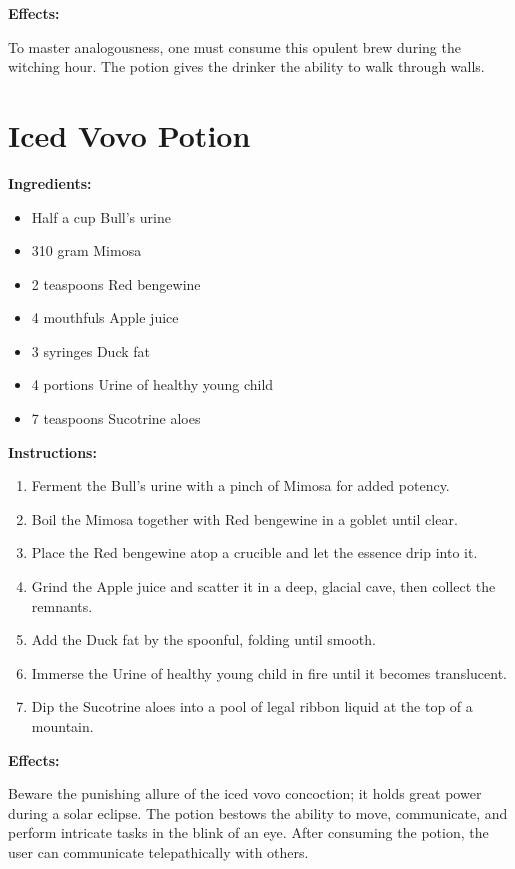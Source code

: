 \documentclass{article}
\begin{document}
\textbf{Effects:}

To master analogousness, one must consume this opulent brew during the witching hour. The potion gives the drinker the ability to walk through walls.

\newpage
\section*{Iced Vovo Potion}

\textbf{Ingredients:}

\begin{itemize}
  \item Half a cup Bull's urine
  \item 310 gram Mimosa
  \item 2 teaspoons Red bengewine
  \item 4 mouthfuls Apple juice
  \item 3 syringes Duck fat
  \item 4 portions Urine of healthy young child
  \item 7 teaspoons Sucotrine aloes
\end{itemize}

\textbf{Instructions:}

\begin{enumerate}
  \item Ferment the Bull's urine with a pinch of Mimosa for added potency.
  \item Boil the Mimosa together with Red bengewine in a goblet until clear.
  \item Place the Red bengewine atop a crucible and let the essence drip into it.
  \item Grind the Apple juice and scatter it in a deep, glacial cave, then collect the remnants.
  \item Add the Duck fat by the spoonful, folding until smooth.
  \item Immerse the Urine of healthy young child in fire until it becomes translucent.
  \item Dip the Sucotrine aloes into a pool of legal ribbon liquid at the top of a mountain.
\end{enumerate}

\textbf{Effects:}

Beware the punishing allure of the iced vovo concoction; it holds great power during a solar eclipse. The potion bestows the ability to move, communicate, and perform intricate tasks in the blink of an eye. After consuming the potion, the user can communicate telepathically with others.
\end{document}
